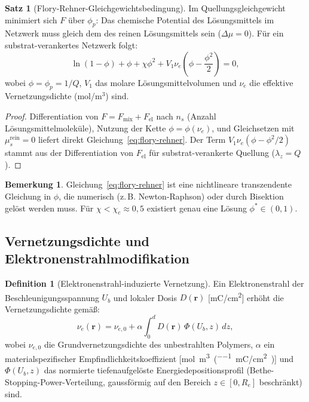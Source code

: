 ﻿\documentclass[a4paper,12pt]{article}
\theoremstyle{definition}
\newtheorem{definition}{Definition}[section]
\newtheorem{satz}{Satz}[section]
\newtheorem{bemerkung}{Bemerkung}[section]
\newcommand{\vect}[1]{\bm{#1}}
\begin{document}
	\begin{satz}[Flory-Rehner-Gleichgewichtsbedingung]
		\label{satz:flory-rehner}
		Im Quellungsgleichgewicht minimiert sich $F$ über $\phi_p$:
		Das chemische Potential des Lösungsmittels im Netzwerk muss gleich dem
		des reinen Lösungsmittels sein ($\Delta\mu = 0$). Für ein substrat-verankertes
		Netzwerk folgt:
		\begin{equation}
			\ln(1-\phi) + \phi + \chi\phi^2 + V_1 \nu_e \left(\phi - \frac{\phi^2}{2}\right) = 0,
			\label{eq:flory-rehner}
		\end{equation}
		wobei $\phi = \phi_p = 1/Q$, $V_1$ das molare Lösungsmittelvolumen und
		$\nu_e$ die effektive Vernetzungsdichte (mol/m$^3$) sind.
	\end{satz}
	
	\begin{proof}
		Differentiation von $F = F_\mathrm{mix} + F_\mathrm{el}$ nach $n_s$
		(Anzahl Lösungsmittelmoleküle), Nutzung der Kette $\phi = \phi(\nu_e)$,
		und Gleichsetzen mit $\mu_s^\mathrm{rein} = 0$ liefert direkt
		Gleichung~\eqref{eq:flory-rehner}.
		Der Term $V_1\nu_e(\phi - \phi^2/2)$ stammt aus der Differentiation
		von $F_\mathrm{el}$ für substrat-verankerte Quellung ($\lambda_z = Q$).
	\end{proof}
	
	\begin{bemerkung}
		Gleichung~\eqref{eq:flory-rehner} ist eine nichtlineare transzendente
		Gleichung in $\phi$, die numerisch (z.\,B. Newton-Raphson) oder
		durch Bisektion gelöst werden muss. Für $\chi < \chi_c \approx 0{,}5$
		existiert genau eine Lösung $\phi^* \in (0,1)$.
	\end{bemerkung}
	
	\subsection{Vernetzungsdichte und Elektronenstrahlmodifikation}
	
	\begin{definition}[Elektronenstrahl-induzierte Vernetzung]
		\label{def:ebeam-vernetzung}
		Ein Elektronenstrahl der Beschleunigungsspannung $U_b$ und lokaler Dosis
		$D(\vect{r})$ [\si{mC/cm^2}] erhöht die Vernetzungsdichte gemäß:
		\begin{equation}
			\nu_e(\vect{r}) = \nu_{e,0} + \alpha \int_0^d D(\vect{r})\,\Phi(U_b, z)\, dz,
			\label{eq:ebeam-vernetzung}
		\end{equation}
		wobei $\nu_{e,0}$ die Grundvernetzungsdichte des unbestrahlten Polymers,
		$\alpha$ ein materialspezifischer Empfindlichkeitskoeffizient
		[\si{mol\per m^3\per (mC/cm^2)}] und $\Phi(U_b, z)$ das normierte
		tiefenaufgelöste Energiedepositionsprofil (Bethe-Stopping-Power-Verteilung,
		gaussförmig auf den Bereich $z \in [0, R_e]$ beschränkt) sind.
	\end{definition}
	
\end{document}
